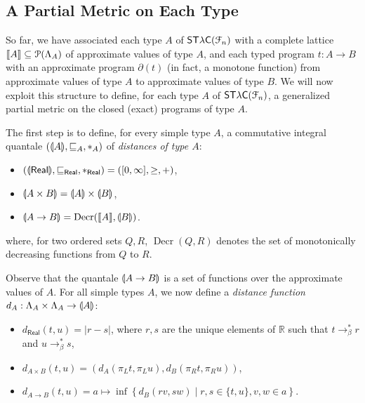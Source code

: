 \subsection{A Partial Metric on Each Type}
\label{subsection:type-gpms}

So far, we have associated each type $A$ of $\mathsf{ST\lambda C}(\mathcal F_{n})$ with a complete lattice $\llbracket A \rrbracket\subseteq \mathcal P(\Lambda_{A})$ of approximate values of type $A$, and each typed program $t:A\to B$ with an approximate program $\partial(t)$ (in fact, a monotone function) from approximate values of type $A$ to approximate values of type $B$.
We will now exploit this structure to define, for each type $A$ of $\mathsf{ST\lambda C}(\mathcal F_{n})$, a generalized partial metric on the closed (exact) programs of type $A$. %



The first step is to define, for every simple type $A$, a commutative integral quantale $(\llparenthesis A \rrparenthesis, \sqsubseteq_A, \mathbin{\ast}_A)$ of \emph{distances of type $A$}:
\begin{itemize}
\item $(\llparenthesis \mathsf{Real} \rrparenthesis, \sqsubseteq_\mathsf{Real}, \mathbin{\ast}_\mathsf{Real}) = ([0,\infty], \geq, +)$,
\item $\llparenthesis A \times B \rrparenthesis = \llparenthesis A \rrparenthesis \times \llparenthesis B \rrparenthesis$,
\item $\llparenthesis A \to B \rrparenthesis =\operatorname{Decr}(\llbracket A \rrbracket, \llparenthesis B \rrparenthesis)$.
\end{itemize}
where, for two ordered sets $Q,R$, $\operatorname{Decr}(Q,R)$ denotes the set of monotonically decreasing functions from $Q$ to $R$.


Observe that the quantale $\llparenthesis A\to B \rrparenthesis$ is a set of functions over the approximate values of $A$.
For all simple types $A$, we now define a \emph{distance function} $d_A : \Lambda_A \times \Lambda_A \to \llparenthesis A \rrparenthesis$:
\begin{itemize}
\item $d_\mathsf{Real}(t,u) = \left\vert r-s \right\vert$, where $r,s$ are the unique elements of $\mathbb{R}$ such that $t \to_\beta^* r$ and $u \to_\beta^* s$,
\item $d_{A \times B}(t,u) = (d_A(\pi_L t, \pi_L u), d_B(\pi_R t, \pi_R u))$,
\item $d_{A \to B}(t,u) = a \mapsto \inf \left\{ d_B(rv, sw) \mid r,s \in \{t,u\}, v,w \in a \right\}$.
\end{itemize}


